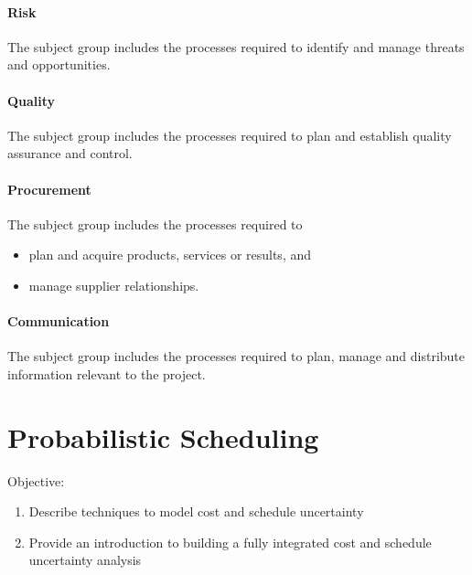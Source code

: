 \documentclass[letterpaper,10pt,english]{jupyterBook}
\begin{document}
\subsubsection{Risk}
\label{\detokenize{PM/pm-processes:risk}}
\sphinxAtStartPar
The  subject group includes the processes required to identify and manage threats and opportunities.


\subsubsection{Quality}
\label{\detokenize{PM/pm-processes:quality}}
\sphinxAtStartPar
The  subject group includes the processes required to plan and establish quality assurance and control.


\subsubsection{Procurement}
\label{\detokenize{PM/pm-processes:procurement}}
\sphinxAtStartPar
The  subject group includes the processes required to
\begin{itemize}
\item {} 
\sphinxAtStartPar
plan and acquire products, services or results, and

\item {} 
\sphinxAtStartPar
manage supplier relationships.

\end{itemize}


\subsubsection{Communication}
\label{\detokenize{PM/pm-processes:communication}}
\sphinxAtStartPar
The  subject group includes the processes required to plan, manage and distribute information relevant to the project.

\sphinxstepscope


\chapter{Probabilistic Scheduling}
\label{\detokenize{PM/jcsrua:probabilistic-scheduling}}\label{\detokenize{PM/jcsrua::doc}}
\sphinxAtStartPar
Objective:
\begin{enumerate}
%
\item {} 
\sphinxAtStartPar
Describe techniques to model cost and schedule uncertainty

\item {} 
\sphinxAtStartPar
Provide an introduction to building a fully integrated cost and schedule uncertainty analysis

\end{enumerate}
\end{document}
